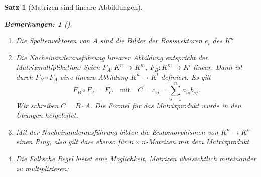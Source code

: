 \documentclass{report}
\theoremstyle{customrem}
\newtheorem*{bemerkung2}{Bemerkungen\textnormal:}
\newenvironment{bemerkungen}[1][]{\begin{bemerkung2}[#1]\leavevmode}{\end{bemerkung2}}
\theoremstyle{customdef}
\newtheorem{satz}[definition]{Satz}
\theoremstyle{customenv}
\begin{document}
\begin{satz}[Matrizen sind lineare Abbildungen]
        \begin{bemerkungen}
        	\begin{enumerate}[label = \roman*)]
        		\item Die Spaltenvektoren von \(A\) sind die Bilder der Basisvektoren \(e_i\) des \(K^n\)
        		\item Die Nacheinanderausführung linearer Abbildung entspricht der Matrixmultiplikation: Seien \(F_A: K^n \to K^m\), \(F_B: K^m \to K^l\) linear. Dann ist durch \(F_B\circ F_A\) eine lineare Abbildung \(K^n\to K^l\) definiert. Es gilt \[F_B\circ F_A = F_C\quad\text{mit}\quad C=c_{ij} = \sum_{s=1}^{n}a_{is}b_{sj}.\] Wir schreiben \(C=B\cdot A\). Die Formel für das Matrixprodukt wurde in den Übungen hergeleitet.
        		\item Mit der Nacheinanderausführung bilden die Endomorphismen von \(K^n \to K^n\) einen Ring, also gilt dass ebenso für \(n\times n\)-Matrizen mit dem Matrixprodukt.
        		\item Die Falksche Regel bietet eine Möglichkeit, Matrizen übersichtlich miteinander zu multiplizieren:

        		\begin{figure}[H]
        			\begin{center}
\end{center}
\end{figure}
\end{enumerate}
\end{bemerkungen}
\end{satz}
\end{document}
